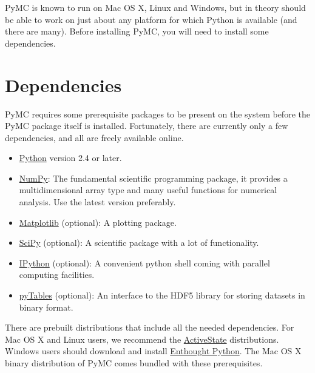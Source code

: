 


PyMC is known to run on Mac OS X, Linux and Windows, but in theory should be
able to work on just about any platform for which Python is available (and
there are many). Before installing PyMC, you will need to install some
dependencies.



\hypertarget{dependencies}{}
\section*{Dependencies}
\label{dependencies}

PyMC requires some prerequisite packages to be present on the system before the
PyMC package itself is installed. Fortunately, there are currently only a few
dependencies, and all are freely available online.
\begin{itemize}
\item {} 
\href{http://www.python.org/.}{Python} version 2.4 or later.

\item {} 
\href{http://www.scipy.org/NumPy}{NumPy}: The fundamental scientific programming package, it provides a
multidimensional array type and many useful functions for numerical analysis.
Use the latest version preferably.

\item {} 
\href{http://matplotlib.sourceforge.net/}{Matplotlib} (optional): A plotting package.

\item {} 
\href{http://www.scipy.org/}{SciPy} (optional): A scientific package with a lot of functionality.

\item {} 
\href{http://ipython.scipy.org/}{IPython} (optional): A convenient python shell coming with parallel
computing facilities.

\item {} 
\href{http://www.pytables.org/moin}{pyTables} (optional): An interface to the HDF5 library for storing datasets
in binary format.

\end{itemize}

There are prebuilt distributions that include all the needed dependencies. For
Mac OS X and Linux users, we recommend the \href{http://www.activestate.com/Products/ActivePython/}{ActiveState} distributions.
Windows users should download and install \href{http://code.enthought.com/enthon/}{Enthought Python}. The Mac OS X
binary distribution of PyMC comes bundled with these prerequisites.


